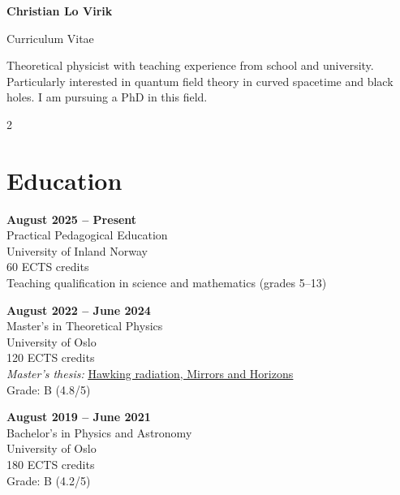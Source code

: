 \documentclass[a4paper,10pt]{article}
\begin{document}
\begin{center}
    {\LARGE \textbf{Christian Lo Virik}}
    
    \vspace{0.2cm}
    {\large Curriculum Vitae}
\end{center}

\vspace{0.3cm}

Theoretical physicist with teaching experience from school and university. Particularly interested in quantum field theory in curved spacetime and black holes. I am pursuing a PhD in this field.

\vspace{0.5cm}

\begin{paracol}{2}

\section*{Education}

\textbf{August 2025 -- Present} \\
Practical Pedagogical Education \\
University of Inland Norway \\
60 ECTS credits \\
Teaching qualification in science and mathematics (grades 5--13)

\vspace{0.3cm}

\textbf{August 2022 -- June 2024} \\
Master’s in Theoretical Physics \\
University of Oslo \\
120 ECTS credits \\
\textit{Master’s thesis:} \href{https://nva.sikt.no/registration/019c8fb09293-4e4c01e0-fe18-440c-b258-452000c9501c}{\underline{Hawking radiation, Mirrors and Horizons}} \\
Grade: B (4.8/5)

\vspace{0.3cm}

\textbf{August 2019 -- June 2021} \\
Bachelor’s in Physics and Astronomy \\
University of Oslo \\
180 ECTS credits \\
Grade: B (4.2/5)

\vspace{0.3cm}


\end{paracol}
\end{document}
